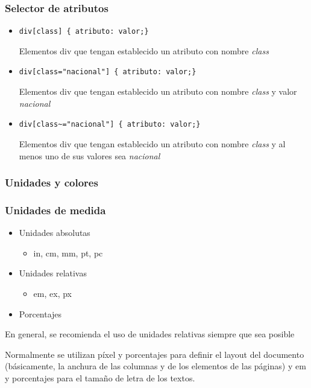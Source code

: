 \documentclass[ucs]{beamer}
\begin{document}
\begin{frame}[fragile]
\frametitle{Selector de atributos}
\begin{itemize}
\item
\verb|div[class] { atributo: valor;}|

Elementos div que tengan establecido un atributo con nombre \emph{class}


\item
\verb|div[class="nacional"] { atributo: valor;}|

Elementos div que tengan establecido un atributo con nombre \emph{class} y valor
\emph{nacional}

\item
\verb|div[class~="nacional"] { atributo: valor;}|

Elementos div que tengan establecido un atributo con nombre \emph{class} y al 
menos uno de sus valores sea
\emph{nacional}


\end{itemize}


\end{frame}





\subsubsection*{Unidades y colores}

\begin{frame}
\frametitle{Unidades de medida}

\begin{itemize}
  \item Unidades absolutas
  \begin{itemize}
    \item in, cm, mm, pt, pc
  \end{itemize}
  \item Unidades relativas
  \begin{itemize}
    \item em, ex, px
  \end{itemize}
  \item Porcentajes
\end{itemize}

En general, se recomienda el uso de unidades relativas siempre que sea posible

Normalmente se utilizan píxel y porcentajes para definir el layout del documento (básicamente, la anchura de las columnas y de los elementos de las páginas) y em y porcentajes para el tamaño de letra de los textos.

\end{frame}
\end{document}
